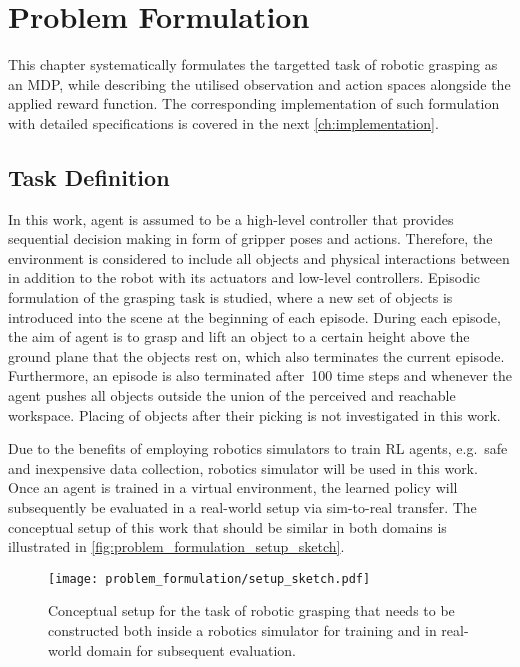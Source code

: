\chapter{Problem Formulation}\label{ch:problem_formulation}

This chapter systematically formulates the targetted task of robotic grasping as an MDP, while describing the utilised observation and action spaces alongside the applied reward function. The corresponding implementation of such formulation with detailed specifications is covered in the next \autoref{ch:implementation}.

\section{Task Definition}\label{sec:problem_formulation_task_definition}

In this work, agent is assumed to be a high-level controller that provides sequential decision making in form of gripper poses and actions. Therefore, the environment is considered to include all objects and physical interactions between in addition to the robot with its actuators and low-level controllers. Episodic formulation of the grasping task is studied, where a new set of objects is introduced into the scene at the beginning of each episode. During each episode, the aim of agent is to grasp and lift an object to a certain height above the ground plane that the objects rest on, which also terminates the current episode. Furthermore, an episode is also terminated after~100 time steps and whenever the agent pushes all objects outside the union of the perceived and reachable workspace. Placing of objects after their picking is not investigated in this work.

Due to the benefits of employing robotics simulators to train RL agents, e.g.~safe and inexpensive data collection, robotics simulator will be used in this work. Once an agent is trained in a virtual environment, the learned policy will subsequently be evaluated in a real-world setup via sim-to-real transfer. The conceptual setup of this work that should be similar in both domains is illustrated in \autoref{fig:problem_formulation_setup_sketch}.

\begin{figure}[ht]
    \centering
    \texttt{[image: problem\_formulation/setup\_sketch.pdf]}
    \caption{Conceptual setup for the task of robotic grasping that needs to be constructed both inside a robotics simulator for training and in real-world domain for subsequent evaluation.}
    \label{fig:problem_formulation_setup_sketch}
\end{figure}


